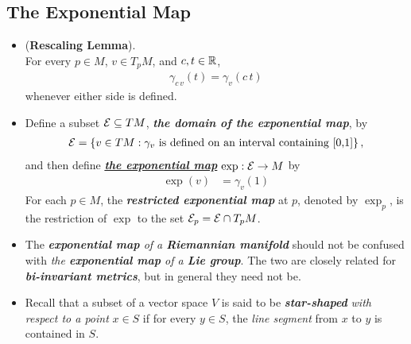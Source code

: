 \documentclass[11pt]{article}
\begin{document}
\subsection{The Exponential Map}
\begin{itemize}
\item \begin{lemma} (\textbf{Rescaling Lemma}).\\
 For every $p\in M$, $v \in T_{p}M$, and $c, t \in {\mathbb R}$,
 \begin{align}
 \gamma_{c\,v}(t) = \gamma_{v}(c\,t) \label{eqn: exp_map_rescaling}
 \end{align} whenever either side is defined.
\end{lemma}

\item \begin{definition}
Define a subset ${\mathcal E} \subseteq  TM$, \emph{\textbf{the domain of the exponential map}}, by
\begin{align*}
{\mathcal E} = \left\{v \in TM: \gamma_v\text{ is defined on an interval containing [0,1]}\right\},
\end{align*}
and then define \underline{\emph{\textbf{the exponential map}}} $\exp: {\mathcal E} \rightarrow M$ by
\begin{align*}
\exp(v)  &= \gamma_{v}(1)
\end{align*}
For each $p \in M$, the \emph{\textbf{restricted exponential map}} at $p$, denoted by $\exp_p$, is the restriction of $\exp$ to the set ${\mathcal E}_p = {\mathcal E} \cap T_{p}M$.
\end{definition}

\item \begin{remark}
The \emph{\textbf{exponential map} of a \textbf{Riemannian manifold}} should not be confused with \emph{the \textbf{exponential map} of a \textbf{Lie group}}. The two are closely related for \emph{\textbf{bi-invariant metrics}}, but in general they need not be. 
\end{remark}

\item \begin{remark}
Recall that a subset of a vector space $V$ is said to be \emph{\textbf{star-shaped}} \emph{with respect to a point} $x \in S$ if for every $y \in S$, the \emph{line segment} from $x$ to $y$ is contained in $S$.
\end{remark}


\end{itemize}
\end{document}
